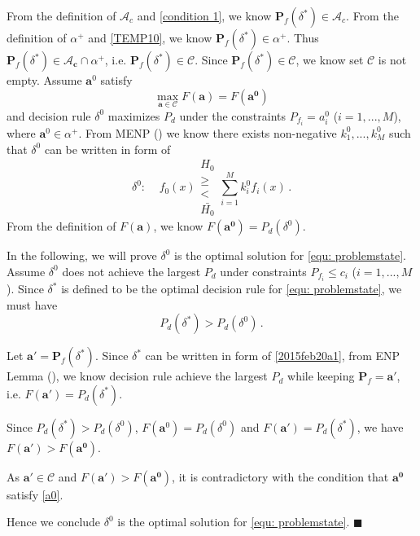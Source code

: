 From the definition of $\mathcal{A}_c$ and \eqref{condition 1}, we know $\mathbf{P}_f(\delta^\ast) \in \mathcal{A}_c$. 
From the definition of $\alpha^+$ and \eqref{TEMP10}, we know $\mathbf{P}_f(\delta^\ast) \in \alpha^+$. 
Thus $\mathbf{P}_f(\delta^\ast) \in \mathcal{A}_\mathbf{c} \cap \alpha^+$, i.e. $\mathbf{P}_f(\delta^\ast) \in \mathcal{C}$. Since  $\mathbf{P}_f(\delta^\ast) \in \mathcal{C}$, we know set $\mathcal{C}$ is not empty.
Assume $\mathbf{a}^0$ satisfy
\begin{equation}
\label{a0}
\max_{\mathbf{a}\in\mathcal{C}} F(\mathbf{a}) = F(\mathbf{a^0})
\end{equation}
and decision rule $\delta^0$ maximizes $P_d$ under the constraints $P_{f_i} = a^0_i$ ($i = 1, ..., M$), where $\mathbf{a}^0 \in \alpha^+$. From MENP () we know there exists non-negative $k_1^0, ..., k_M^0$ such that $\delta^0$ can be written in form of 
\[
\delta^0:\;\;\;\;f_0(x) \substack{H_0 \\ \geq \\ < \\ \bar{H_0}} \sum_{i=1}^{M}k_i^0f_i(x)\,.
\] 
From the definition of $F(\mathbf{a})$, we know $F(\mathbf{a^0}) = P_d(\delta^0)$.

In the following, we  will prove $\delta^0$ is the optimal solution for \eqref{equ: problemstate}. 
Assume  $\delta^0$ does not achieve the largest $P_d$ under constraints $P_{f_i} \leq c_i$ ($i=1, ..., M$). Since $\delta^\ast $ is defined to be the optimal decision rule for \eqref{equ: problemstate}, we must have 
\begin{equation}
\label{condition 2}
P_{d}(\delta^\ast) > P_d(\delta^0)\,.
\end{equation}

Let $\mathbf{a}' = \mathbf{P}_f(\delta^\ast)$. 
Since $\delta^\ast$ can be written in form of \eqref{2015feb20a1}, from ENP Lemma (), we know decision rule achieve the largest $P_d$ while keeping $\mathbf{P}_f = \mathbf{a}'$, i.e.  
$F(\mathbf{a}') = P_d(\delta^\ast)$. 

Since $P_d(\delta^\ast) > P_d(\delta^0)$, $F(\mathbf{a}^0) = P_d(\delta^0)$ and  $F(\mathbf{a}') = P_d(\delta^\ast)$, we have $F(\mathbf{a'}) > F(\mathbf{a^0})$. 

As $\mathbf{a}' \in \mathcal{C}$ and $F(\mathbf{a'}) > F(\mathbf{a^0})$, it is contradictory with the condition that $\mathbf{a^0}$ satisfy \eqref{a0}.

Hence we conclude $\delta^0$ is the optimal solution for \eqref{equ: problemstate}. $\blacksquare$

